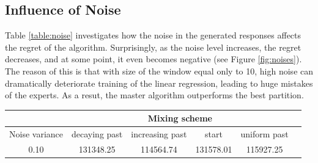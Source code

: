 \documentclass[12pt, twoside]{article}
\begin{document}
\subsection{Influence of Noise}
Table \ref{table:noise} investigates how the noise in the generated responses affects the regret of the algorithm.  
Surprisingly, as the noise level increases, the regret decreases, and at some point, it even becomes negative (see Figure \ref{fig:noises}). 
The reason of this is that with size of the window equal only to 10, high noise can dramatically deteriorate training of the linear regression, leading to huge mistakes of the experts. As a resut, the master algorithm outperforms the best partition.

\begin{table}[H]
\centering

\begin{tabular}{c|ccccc}
\toprule
& \multicolumn{4}{c}{Mixing scheme} \\
\toprule
{Noise variance} & \centering decaying past & \centering increasing past & \centering start & \centering uniform past &  \\
\midrule
0.10 & 131348.25 & 114564.74 & 131578.01 & 115927.25 \\


\end{tabular}
\end{table}
\end{document}
